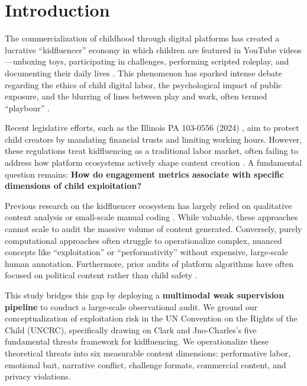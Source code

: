 \documentclass[letterpaper]{article} %
\begin{document}
\section{Introduction}

The commercialization of childhood through digital platforms has created a lucrative ``kidfluencer'' economy in which children are featured in YouTube videos---unboxing toys, participating in challenges, performing scripted roleplay, and documenting their daily lives \citep{clark2025child}. This phenomenon has sparked intense debate regarding the ethics of child digital labor, the psychological impact of public exposure, and the blurring of lines between play and work, often termed ``playbour'' \citep{abidin2015micromicrocelebrity}.

Recent legislative efforts, such as the Illinois PA 103-0556 (2024) \citep{illinois2024}, aim to protect child creators by mandating financial trusts and limiting working hours. However, these regulations treat kidfluencing as a traditional labor market, often failing to address how platform ecosystems actively shape content creation \citep{unicef2025}. A fundamental question remains: \textbf{How do engagement metrics associate with specific dimensions of child exploitation?}

Previous research on the kidfluencer ecosystem has largely relied on qualitative content analysis or small-scale manual coding \citep{divon2025children,anderson2025growing}. While valuable, these approaches cannot scale to audit the massive volume of content generated. Conversely, purely computational approaches often struggle to operationalize complex, nuanced concepts like ``exploitation'' or ``performativity'' without expensive, large-scale human annotation. Furthermore, prior audits of platform algorithms \citep{huszar2022algorithmic,haroon2023auditing} have often focused on political content rather than child safety \citep{papadamou2020disturbed}.

This study bridges this gap by deploying a \textbf{multimodal weak supervision pipeline} to conduct a large-scale observational audit. We ground our conceptualization of exploitation risk in the UN Convention on the Rights of the Child (UNCRC), specifically drawing on Clark and Jno-Charles's \citep{clark2025child} five fundamental threats framework for kidfluencing. We operationalize these theoretical threats into six measurable content dimensions: performative labor, emotional bait, narrative conflict, challenge formats, commercial content, and privacy violations.
\end{document}
